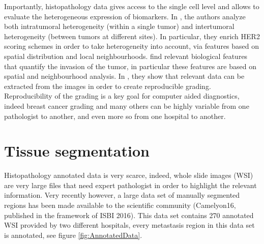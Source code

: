 \documentclass[a4paper,10pt,twocolumn]{article}
\begin{document}
Importantly, histopathology data gives access to the single cell level
and allows to evaluate the heterogeneous expression of biomarkers. In
\citet{potts2012evaluating}, the authors analyze both intratumoral
heterogeneity (within a single tumor) and
intertumoral heterogeneity (between tumors at different sites). 
In particular, they enrich HER2 scoring schemes in order to take
heterogeneity into account, 
 via features based on spatial distribution and local neighbourhoods. 
 \citet{harder2016cooccurence} find relevant biological features that quantify the invasion of 
 the tumor, in particular these features are based on spatial and neighbourhood analysis. In 
 \citet{petushi2006large}, they show that relevant data can be
 extracted from the images in 
 order to create reproducible grading. 
Reproducibility of the grading is a key goal for computer 
 aided diagnostics, indeed breast cancer grading and many others can be highly variable from 
 one pathologist to another, and even more so from one hospital to
 another. 

\section{Tissue segmentation}

Histopathology annotated data is very scarce, indeed, whole slide
images (WSI) are very large files that need expert pathologist in
order to highlight the relevant information. Very recently however, a
large data set of manually segmented regions has been made available
to the scientific community (Camelyon16, published in the framework of
ISBI 2016). This data set contains 270 annotated
WSI provided by two different hospitals, every metastasis region in
this data set is annotated, see figure \ref{fig:AnnotatedData}. 
\end{document}
